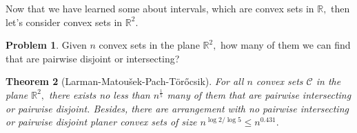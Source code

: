 \documentclass{article}
\newtheorem{theorem}{Theorem}[section]
\theoremstyle{definition}
\newtheorem{problem}[theorem]{Problem}
\begin{document}
Now that we have learned some about intervals, which are convex sets in $\mathbb{R},$ then let's consider convex sets in $\mathbb{R}^2$.

\begin{problem}
    Given $n$ convex sets in the plane $\mathbb{R}^2,$ how many of them we can find that are pairwise disjoint or intersecting?
\end{problem}

\begin{theorem}[Larman-Matou\v{s}ek-Pach-T\"{o}r\H{o}csik\cite{LarmanDavidet1994}]
    For all $n$ convex sets $\mathcal{C}$ in the plane $\mathbb{R}^2,$ there exists no less than $n^\frac{1}{5}$ many of them that are pairwise intersecting or pairwise disjoint. Besides, there are arrangement with no pairwise intersecting or pairwise disjoint planer convex sets of size $n^{\log2/\log5}\leqslant n^{0.431}.$
\end{theorem}
\end{document}
